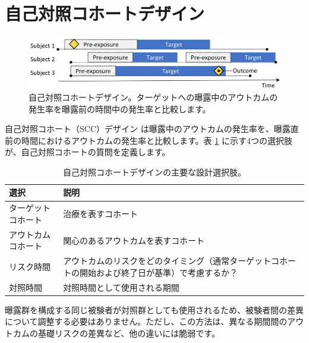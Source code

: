 \documentclass[
  11pt]{book}
\theoremstyle{definition}
\theoremstyle{definition}
\theoremstyle{definition}
\theoremstyle{definition}
\theoremstyle{remark}
\begin{document}
\section{自己対照コホートデザイン}\label{ux81eaux5df1ux5bfeux7167ux30b3ux30dbux30fcux30c8ux30c7ux30b6ux30a4ux30f3}


\begin{figure}[h]

{\centering \includegraphics[width=0.9\linewidth]{images/PopulationLevelEstimation/selfControlledCohort} 

}

\caption{自己対照コホートデザイン。ターゲットへの曝露中のアウトカムの発生率を曝露前の時間中の発生率と比較します。}\label{fig:scc}
\end{figure}

自己対照コホート（SCC）デザイン \citep{ryan_2013} は曝露中のアウトカムの発生率を、曝露直前の時間におけるアウトカムの発生率と比較します。表 \ref{tab:sccChoices} に示す4つの選択肢が、自己対照コホートの質問を定義します。  

\begin{table}
\centering
\caption{\label{tab:sccChoices}自己対照コホートデザインの主要な設計選択肢。}
\centering
\begin{tabular}[t]{l>{\raggedright\arraybackslash}p{9cm}}
\toprule
選択 & 説明\\
\midrule
ターゲットコホート & 治療を表すコホート\\
アウトカムコホート & 関心のあるアウトカムを表すコホート\\
リスク時間 & アウトカムのリスクをどのタイミング（通常ターゲットコホートの開始および終了日が基準）で考慮するか？\\
対照時間 & 対照時間として使用される期間\\
\bottomrule
\end{tabular}
\end{table}

曝露群を構成する同じ被験者が対照群としても使用されるため、被験者間の差異について調整する必要はありません。ただし、この方法は、異なる期間間のアウトカムの基礎リスクの差異など、他の違いには脆弱です。
\end{document}
